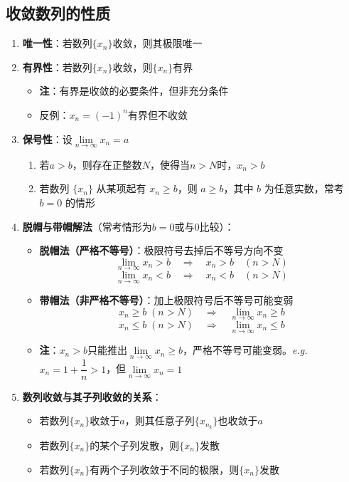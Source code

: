 \documentclass[a4paper,12pt]{article}
\begin{document}
    \subsection{收敛数列的性质}
    \begin{enumerate}
        \item \textbf{唯一性}：若数列$\{x_n\}$收敛，则其极限唯一

        \item \textbf{有界性}：若数列$\{x_n\}$收敛，则$\{x_n\}$有界
        \begin{itemize}
            \item \textbf{注}：有界是收敛的必要条件，但非充分条件
            \item 反例：$x_n = (-1)^n$有界但不收敛
        \end{itemize}

        \item \textbf{保号性}：设$\lim\limits_{n\to\infty} x_n = a$
        \begin{enumerate}
            \item 若$a > b$，则存在正整数$N$，使得当$n > N$时，$x_n > b$
            \item 若数列 $\{x_n\}$ 从某项起有 $x_n \geq b$，则 $a \geq b$，其中 $b$ 为任意实数，常考 $b = 0$ 的情形
        \end{enumerate}

        \item \textbf{脱帽与带帽解法}（常考情形为$b = 0$或与$0$比较）：
        \begin{itemize}
            \item \textbf{脱帽法（严格不等号）}：极限符号去掉后不等号方向不变
            \[
                \lim_{n\to\infty} x_n > b \quad \Rightarrow \quad x_n > b \quad (n > N)
            \]
            \[
                \lim_{n\to\infty} x_n < b \quad \Rightarrow \quad x_n < b \quad (n > N)
            \]

            \item \textbf{带帽法（非严格不等号）}：加上极限符号后不等号可能变弱
            \[
                x_n \ge b \;(n > N) \quad \Rightarrow \quad \lim_{n\to\infty} x_n \ge b
            \]
            \[
                x_n \le b \;(n > N) \quad \Rightarrow \quad \lim_{n\to\infty} x_n \le b
            \]
            \item \textbf{注}：$x_n > b$只能推出$\lim\limits_{n\to\infty} x_n \ge b$，严格不等号可能变弱。\emph{e.g.} $x_n = 1 + \dfrac{1}{n} > 1$，但$\lim\limits_{n\to\infty} x_n = 1$
        \end{itemize}
        \item \textbf{数列收敛与其子列收敛的关系}：
        \begin{itemize}
            \item 若数列$\{x_n\}$收敛于$a$，则其任意子列$\{x_{n_k}\}$也收敛于$a$
            \item 若数列$\{x_n\}$的某个子列发散，则$\{x_n\}$发散
            \item 若数列$\{x_n\}$有两个子列收敛于不同的极限，则$\{x_n\}$发散
        \end{itemize}
    \end{enumerate}
\end{document}
